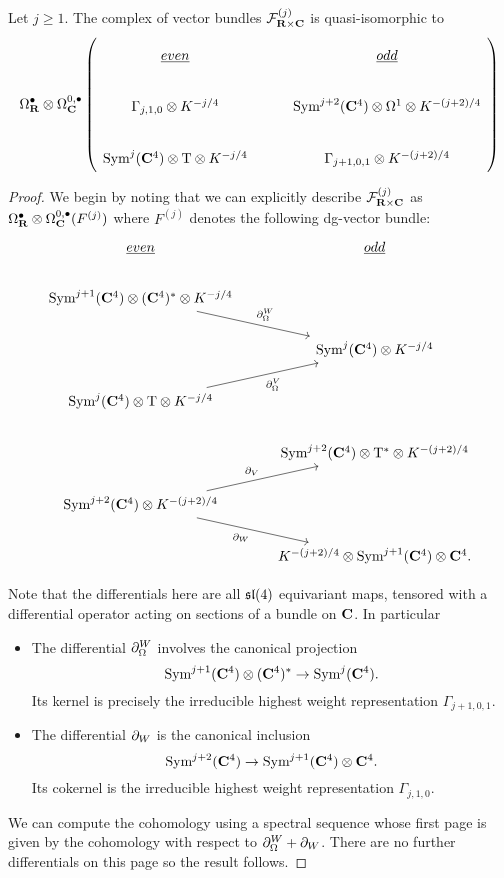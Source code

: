 \documentclass[../main.tex]{subfiles}
\begin{document}
\begin{prop}
Let $j\geq 1$. The complex of vector bundles $\mathcal{F}^{(j)}_{\mathbf{R}\times \mathbf{C}}$ is quasi-isomorphic to 
\begin{equation}
\Omega^\bullet_\R\otimes \Omega^{0,\bullet}_\C \left (
\begin{tikzcd}
\ul{even} & \ul{odd} \\
\Gamma_{j,1,0} \otimes K^{-j/4} & \Sym^{j+2}(\C^4) \otimes \Omega^1 \otimes K^{-(j+2)/4} \\
\Sym^j (\C^4) \otimes \T \otimes K^{-j/4} & \Gamma_{j+1, 0, 1} \otimes K^{-(j+2)/4}
\end{tikzcd} \right )
\end{equation}


\end{prop}
\begin{proof}
We begin by noting that we can explicitly describe $\mathcal{F}_{\mathbf{R}\times \mathbf{C}}^{(j)}$ as $\Omega^\bullet _{\mathbf{R}} \otimes \Omega^{0,\bullet}_{\mathbf{C}} (F^{(j)})$ where $F^{(j)}$ denotes the following dg-vector bundle:
\begin{equation}
\begin{tikzcd}
\ul{even} & \ul{odd} \\
\Sym^{j+1} (\C^4) \otimes (\C^4)^* \otimes K^{-j/4} \ar[dr, "\del^W_\Omega"] \\ & \Sym^j (\C^4) \otimes K^{-j/4} \\ 
\Sym^j (\C^4) \otimes \T \otimes K^{-j/4} \ar[ur, "\del^V_\Omega"'] & \\
& \Sym^{j+2}(\C^4) \otimes \T^*\otimes K^{-(j+2)/4}\\ 
\Sym^{j+2} (\C^4) \otimes K^{-(j+2)/4}\ar[ur, "\del_V"] \ar[dr, "\del_W"'] \\
& K^{-(j+2)/4}\otimes \Sym^{j+1}(\C^4) \otimes \C^4 . 
\end{tikzcd}
\end{equation}

Note that the differentials here are all $\mathfrak{sl}(4)$ equivariant maps, tensored with a differential operator acting on sections of a bundle on $\mathbf{C}$. In particular

\begin{itemize}
\item The differential $\partial^W_\Omega$ involves the canonical projection 
\[\text{Sym}^{j+1} (\mathbf{C}^4)\otimes (\mathbf{C}^4)^* \to \text{Sym}^j (\mathbf{C}^4).\] Its kernel is precisely the irreducible highest weight representation $\Gamma_{j+1, 0 ,1}$.

\item The differential $\partial_W$ is the canonical inclusion 
\[\text{Sym}^{j+2} (\mathbf{C}^4) \to \text{Sym}^{j+1}(\mathbf{C}^4) \otimes \mathbf{C}^4.\] Its cokernel is the irreducible highest weight representation $\Gamma_{j, 1, 0}$.
\end{itemize}

We can compute the cohomology using a spectral sequence whose first page is given by the cohomology with respect to $\partial^W_\Omega + \partial_W$. There are no further differentials on this page so the result follows. 
\end{proof}
\end{document}
